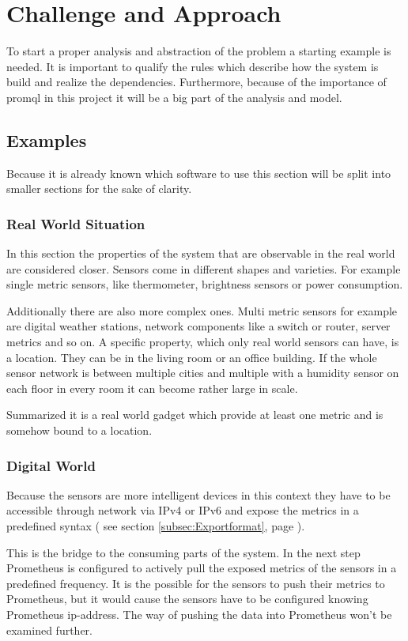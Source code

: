 \chapter{Challenge and Approach}
\label{chapter:bestandsaufnahme}
To start a proper analysis and abstraction of the problem a starting example is needed. It is important to qualify the rules which describe how the system is build and realize the dependencies. Furthermore, because of the importance of \gls{promql} in this project it will be a big part of the analysis and model.
\section{Examples}
Because it is already known which software to use this section will be split into smaller sections for the sake of clarity. 

\subsection{Real World Situation}
In this section the properties of the system that are observable in the real world are considered closer. Sensors come in different shapes and varieties. For example single metric sensors, like thermometer, brightness sensors or power consumption. 

Additionally there are also more complex ones. Multi metric sensors for example are digital weather stations, network components like a switch or router, server metrics and so on. A specific property, which only real world sensors can have, is a location. They can be in the living room or an office building. If the whole sensor network is between multiple cities and multiple with a humidity sensor on each floor in every room it can become rather large in scale.

Summarized it is a real world gadget which provide at least one metric and is somehow bound to a location.

\subsection{Digital World}
Because the sensors are more intelligent devices in this context they have to be accessible through network via \gls{IPv4} or \gls{IPv6} and expose the metrics in a predefined syntax ( see section \ref{subsec:Exportformat}, page \pageref{subsec:Exportformat} ). 

This is the bridge to the consuming parts of the system. In the next step Prometheus is configured to actively pull the exposed metrics of the sensors in a predefined frequency. It is the possible for the sensors to push their metrics to Prometheus, but it would cause the sensors have to be configured knowing  Prometheus \gls{ip-address}. The way of pushing the data into Prometheus won't be examined further.

